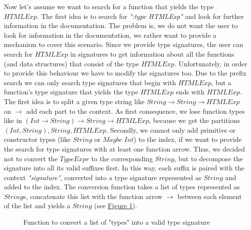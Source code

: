 \documentclass[%
	pdftex,%
	a4paper,%
	oneside,%
	chapterprefix,%
	headsepline,%
	12pt%
]{scrbook}
\newcommand{\textss}[1]{"#1"}
\newcommand{\Conid}[1]{\mathit{#1}}
\newcommand{\Varid}[1]{\mathit{#1}}
\def\resethooks{%
  \global\let\SaveRestoreHook\empty
  \global\let\ColumnHook\empty}
\let\hspre\empty
\let\hspost\empty
\begin{document}
Now let's assume we want to search for a function that yields the type
\ensuremath{\Conid{HTMLExp}}. %
The first idea is to search for \emph{\textss{:type HTMLExp}} and look
for further information in the documentation. %
The problem is, we do not want the user to look for information in the
documentation, we rather want to provide a mechanism to cover this
scenario. %
Since we provide type signatures, the user can search for \ensuremath{\Conid{HTMLExp}} in
signatures to get information about all the functions (and data
structures) that consist of the type \ensuremath{\Conid{HTMLExp}}. %
Unfortunately, in order to provide this behaviour we have to modify
the signatures too. %
Due to the prefix search we can only search type signatures that begin
with \ensuremath{\Conid{HTMLExp}}, but a function's type signature that yields the type
\ensuremath{\Conid{HTMLExp}} ends with \ensuremath{\Conid{HTMLExp}}. %
The first idea is to split a given type string like \ensuremath{\Conid{String}\to \Conid{String}\to \Conid{HTMLExp}} on \ensuremath{\to } add each part to the context. As first
consequence, we lose function types like in \ensuremath{(\Conid{Int}\to \Conid{String})\to \Conid{String}\to \Conid{HTMLExp}}, because we get the partitions \ensuremath{(\Conid{Int},\Conid{String}),\Conid{String},\Conid{HTMLExp}}. %
Secondly, we cannot only add primitive or constructor types (like
\ensuremath{\Conid{String}} or \ensuremath{\Conid{Maybe}\;\Conid{Int}}) to the index, if we want to provide the
search for type signatures with at least one function arrow. %
Thus, we decided not to convert the \ensuremath{\Conid{TypeExpr}} to the corresponding
\ensuremath{\Conid{String}}, but to decompose the signature into all its valid suffixes
first.%
In this way, each suffix is paired with the context
\emph{\textss{signature}}, converted into a type signature represented
as \ensuremath{\Conid{String}} and added to the index. The conversion function takes a
list of types represented as \ensuremath{\Conid{String}}s, concatenate this list with the
function arrow \ensuremath{\to } between each element of the list and yields a
\ensuremath{\Conid{String}} (see
\hyperref[fig:listToSignature]{Figure \ref{fig:listToSignature}}). %

\begin{figure}[h]
\resethooks
\caption{Function to convert a list of \textss{types} into a valid
  type signature}
\label{fig:listToSignature}
\end{figure}
\end{document}
